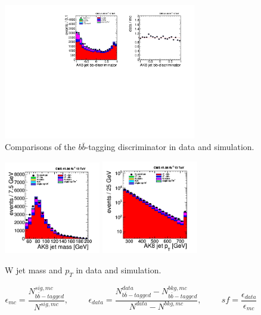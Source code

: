 \begin{figure}[hbp!]
\centering
\includegraphics[width=0.75\textwidth]{figs/datamccomparisons_hadJetAK8_disc.pdf}
\caption{Comparisons of the $b\bar{b}$-tagging discriminator in data and simulation.}
\label{fig:disc}
\end{figure}

\begin{figure}[hbp!]
\centering
\includegraphics[width=0.375\textwidth]{figs/ak8jetmass.png}
\includegraphics[width=0.375\textwidth]{figs/ak8jetpt.png}
\caption{W jet mass and $p_{T}$ in data and simulation.}
\label{fig:disc}
\end{figure}

\begin{equation}
\epsilon_{mc} = \frac{ N_{b\bar{b}-tagged}^{sig, mc} } { N^{sig, mc} }, \hspace{1cm}
\epsilon_{data} = \frac{N_{b\bar{b}-tagged}^{data}-N_{b\bar{b}-tagged}^{bkg, mc}}{N^{data} - N^{bkg, mc}}, \hspace{1cm}
sf = \frac{\epsilon_{data}} {\epsilon_{mc}}
\end{equation}

